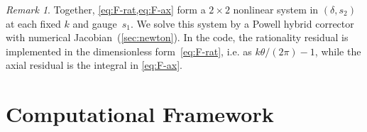 \documentclass[11pt,a4paper]{article}
\theoremstyle{plain}
\theoremstyle{definition}
\theoremstyle{remark}
\newtheorem{remark}[theorem]{Remark}
\begin{document}
\begin{remark}
  Together, \cref{eq:F-rat,eq:F-ax} form a $2 \times 2$ nonlinear
  system in $(\delta, s_2)$ at each fixed $k$ and gauge~$s_1$.  We
  solve this system by a Powell hybrid corrector with numerical
  Jacobian~(\cref{sec:newton}).  In the code, the rationality residual is
  implemented in the dimensionless form~\eqref{eq:F-rat}, i.e.
  as $k\theta/(2\pi)-1$, while the axial residual is the integral in
  \eqref{eq:F-ax}.
\end{remark}


\section{Computational Framework}\label{sec:computational}
\end{document}
